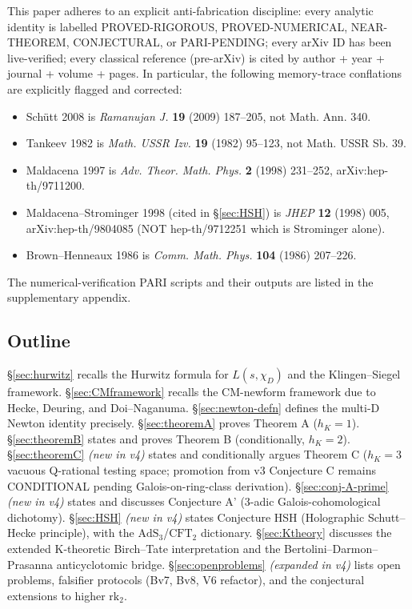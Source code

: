 \documentclass[11pt,a4paper]{amsart}
\theoremstyle{definition}
\newcommand{\hK}{h_{K}}
\newcommand{\rktwo}{\mathrm{rk}_2}
\begin{document}
This paper adheres to an explicit anti-fabrication discipline: every analytic identity is labelled PROVED-RIGOROUS, PROVED-NUMERICAL, NEAR-THEOREM, CONJECTURAL, or PARI-PENDING; every arXiv ID has been live-verified; every classical reference (pre-arXiv) is cited by author + year + journal + volume + pages. In particular, the following memory-trace conflations are explicitly flagged and corrected:
\begin{itemize}[leftmargin=2em]
  \item Sch\"utt 2008 is \emph{Ramanujan J.} \textbf{19} (2009) 187--205, not Math. Ann. 340.
  \item Tankeev 1982 is \emph{Math. USSR Izv.} \textbf{19} (1982) 95--123, not Math. USSR Sb. 39.
  \item Maldacena 1997 is \emph{Adv. Theor. Math. Phys.} \textbf{2} (1998) 231--252, arXiv:hep-th/9711200.
  \item Maldacena--Strominger 1998 (cited in \S\ref{sec:HSH}) is \emph{JHEP} \textbf{12} (1998) 005, arXiv:hep-th/9804085 (NOT hep-th/9712251 which is Strominger alone).
  \item Brown--Henneaux 1986 is \emph{Comm. Math. Phys.} \textbf{104} (1986) 207--226.
\end{itemize}

The numerical-verification PARI scripts and their outputs are listed in the supplementary appendix.

\subsection{Outline}\label{sec:outline}

\S\ref{sec:hurwitz} recalls the Hurwitz formula for $L(s,\chi_D)$ and the Klingen--Siegel framework. \S\ref{sec:CMframework} recalls the CM-newform framework due to Hecke, Deuring, and Doi--Naganuma. \S\ref{sec:newton-defn} defines the multi-D Newton identity precisely. \S\ref{sec:theoremA} proves Theorem A ($\hK = 1$). \S\ref{sec:theoremB} states and proves Theorem B (conditionally, $\hK = 2$). \S\ref{sec:theoremC} \emph{(new in v4)} states and conditionally argues Theorem C ($\hK = 3$ vacuous Q-rational testing space; promotion from v3 Conjecture C remains CONDITIONAL pending Galois-on-ring-class derivation). \S\ref{sec:conj-A-prime} \emph{(new in v4)} states and discusses Conjecture A' (3-adic Galois-cohomological dichotomy). \S\ref{sec:HSH} \emph{(new in v4)} states Conjecture HSH (Holographic Schutt--Hecke principle), with the $\mathrm{AdS}_3$/$\mathrm{CFT}_2$ dictionary. \S\ref{sec:Ktheory} discusses the extended K-theoretic Birch--Tate interpretation and the Bertolini--Darmon--Prasanna anticyclotomic bridge. \S\ref{sec:openproblems} \emph{(expanded in v4)} lists open problems, falsifier protocols (Bv7, Bv8, V6 refactor), and the conjectural extensions to higher $\rktwo$.
\end{document}

